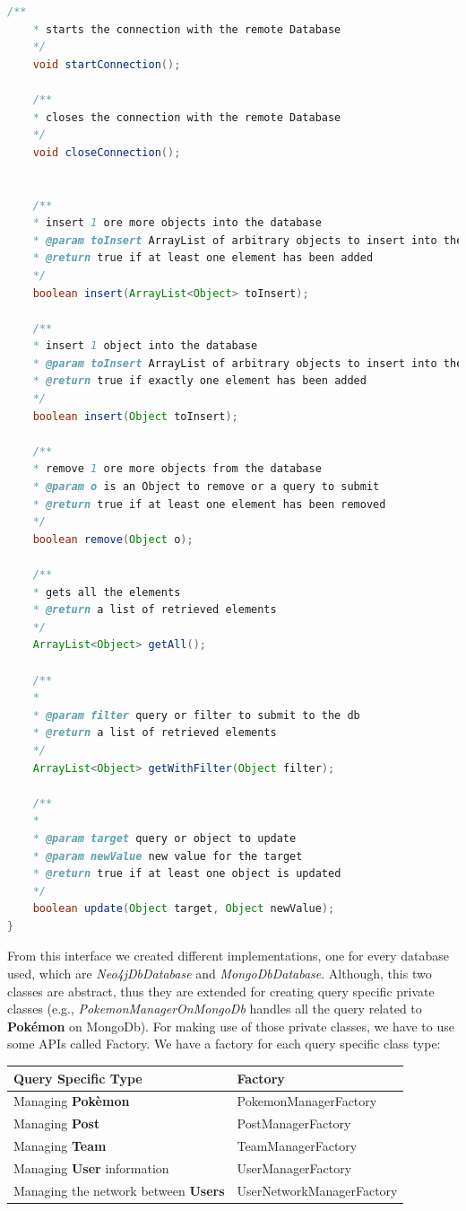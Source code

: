 \begin{lstlisting}[language=Java]
	/**
	* starts the connection with the remote Database
	*/
	void startConnection();
	
	/**
	* closes the connection with the remote Database
	*/
	void closeConnection();
	
	
	/**
	* insert 1 ore more objects into the database
	* @param toInsert ArrayList of arbitrary objects to insert into the Database
	* @return true if at least one element has been added
	*/
	boolean insert(ArrayList<Object> toInsert);
	
	/**
	* insert 1 object into the database
	* @param toInsert ArrayList of arbitrary objects to insert into the Database
	* @return true if exactly one element has been added
	*/
	boolean insert(Object toInsert);
	
	/**
	* remove 1 ore more objects from the database
	* @param o is an Object to remove or a query to submit
	* @return true if at least one element has been removed
	*/
	boolean remove(Object o);
	
	/**
	* gets all the elements
	* @return a list of retrieved elements
	*/
	ArrayList<Object> getAll();
	
	/**
	*
	* @param filter query or filter to submit to the db
	* @return a list of retrieved elements
	*/
	ArrayList<Object> getWithFilter(Object filter);
	
	/**
	*
	* @param target query or object to update
	* @param newValue new value for the target
	* @return true if at least one object is updated
	*/
	boolean update(Object target, Object newValue);
}
\end{lstlisting}
From this interface we created different implementations, one for every database used, which are \textit{Neo4jDbDatabase} and \textit{MongoDbDatabase}. Although, this two classes are abstract, thus they are extended for creating query specific private classes (e.g., \textit{PokemonManagerOnMongoDb} handles all the query related to \textbf{Pokémon} on MongoDb).
For making use of those private classes, we have to use some APIs called Factory. We have a factory for each query specific class type:

\begingroup
\setlength{\tabcolsep}{10pt} %
\renewcommand{\arraystretch}{1.5} %
\begin{center}
	\begin{longtable}{| m{16em} | m{16em} |} 
		\hline
		\textbf{Query Specific Type} & \textbf{Factory} \\ [0.5ex] 
		\hline
		Managing \textbf{Pokèmon} & PokemonManagerFactory\\ 
		\hline
		Managing \textbf{Post} & PostManagerFactory\\
		\hline
		Managing \textbf{Team} & TeamManagerFactory\\
		\hline
		Managing \textbf{User} information & UserManagerFactory\\
		\hline
		Managing the network between \textbf{Users} & UserNetworkManagerFactory\\
		\hline
	\end{longtable}
\end{center}
\endgroup

